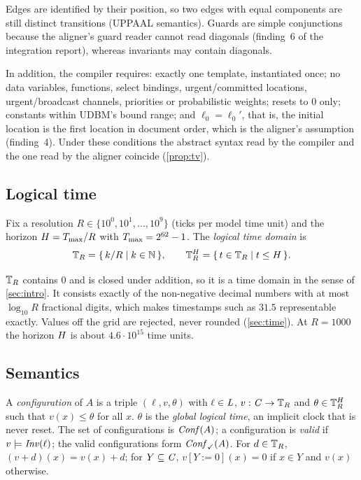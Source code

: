 Edges are identified by their position, so two edges with equal components are
still distinct transitions (UPPAAL semantics). Guards are simple conjunctions
because the aligner's guard reader cannot read diagonals (finding~6 of the
integration report), whereas invariants may contain diagonals.

\begin{remark}\label{rem:side}
In addition, the compiler requires: exactly one template, instantiated once;
no data variables, functions, select bindings, urgent/committed locations,
urgent/broadcast channels, priorities or probabilistic weights; resets to
$0$ only; constants within UDBM's bound range; and $\ell_0=\ell_0'$, that is,
the initial location is the first location in document order, which is the
aligner's assumption (finding~4). Under these conditions the abstract syntax
read by the compiler and the one read by the aligner coincide (\cref{prop:tv}).
\end{remark}

\subsection{Logical time}

\begin{definition}\label{def:grid}
Fix a resolution $R\in\{10^0,10^1,\dots,10^9\}$ (ticks per model time unit) and
the horizon $H=T_{\max}/R$ with $T_{\max}=2^{62}-1$. The \emph{logical time domain} is
\[
  \mathbb{T}_R=\{\,k/R\mid k\in\mathbb{N}\,\},\qquad \mathbb{T}_R^{H}=\{\,t\in\mathbb{T}_R\mid t\le H\,\}.
\]
\end{definition}

$\mathbb{T}_R$ contains $0$ and is closed under addition, so it is a time domain in the
sense of \cref{sec:intro}. It consists exactly of the non-negative decimal
numbers with at most $\log_{10}R$ fractional digits, which makes timestamps such
as $31.5$ representable exactly. Values off the grid are rejected, never rounded
(\cref{sec:time}). At $R=1000$ the horizon $H$ is about $4.6\cdot10^{15}$ time
units.

\subsection{Semantics}

\begin{definition}[Configurations]\label{def:conf}
A \emph{configuration} of $A$ is a triple $(\ell,v,\theta)$ with $\ell\in\mathit{L}$,
$v:\mathit{C}\to\mathbb{T}_R$ and $\theta\in\mathbb{T}_R^{H}$ such that $v(x)\le\theta$ for all $x$.
$\theta$ is the \emph{global logical time}, an implicit clock that is never
reset. The set of configurations is $\mathit{Conf}(A)$; a configuration is
\emph{valid} if $v\models\mathit{Inv}(\ell)$; the valid configurations form $\mathit{Conf}_{\checkmark}(A)$.
For $d\in\mathbb{T}_R$, $(v+d)(x)=v(x)+d$; for $Y\subseteq\mathit{C}$, $v[Y{:=}0](x)=0$ if $x\in Y$
and $v(x)$ otherwise.
\end{definition}

